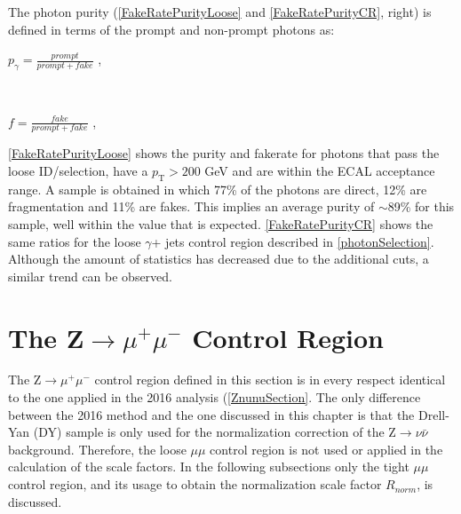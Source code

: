 The photon purity (\autoref{FakeRatePurityLoose} and \autoref{FakeRatePurityCR}, right) is defined in terms of the prompt and non-prompt photons as:\\

\begingroup
	\large
	\begin{center}
		$p_\gamma = \frac{prompt}{prompt+fake}$ ,
	\end{center}
\endgroup
\vspace{1em}

\\

\begingroup
	\large
	\begin{center}
		$f = \frac{fake}{prompt+fake}$ ,
	\end{center}
\endgroup
\vspace{1em}

\autoref{FakeRatePurityLoose} shows the purity and fakerate for photons that pass the loose ID/selection, have a $p_\text{T} > 200$ GeV and are within the ECAL acceptance range. A sample is obtained in which 77\% of the photons are direct, 12\% are fragmentation and 11\% are fakes. This implies an average purity of $\sim$89\% for this sample, well within the value that is expected. \autoref{FakeRatePurityCR} shows the same ratios for the loose $\gamma$+ jets control region described in \autoref{photonSelection}. Although the amount of statistics has decreased due to the additional cuts, a similar trend can be observed.

\section{The Z$\rightarrow\mu^{+}\mu^{-}$ Control Region}

The Z$\rightarrow\mu^{+}\mu^{-}$ control region defined in this section is in every respect identical to the one applied in the 2016 analysis (\autoref{ZnunuSection}. The only difference between the 2016 method and the one discussed in this chapter is that the Drell-Yan (DY) sample is only used for the normalization correction of the Z$\rightarrow\nu\bar{\nu}$ background. Therefore, the loose $\mu\mu$ control region is not used or applied in the calculation of the scale factors. In the following subsections only the tight $\mu\mu$ control region, and its usage to obtain the normalization scale factor $R_{norm}$, is discussed.

